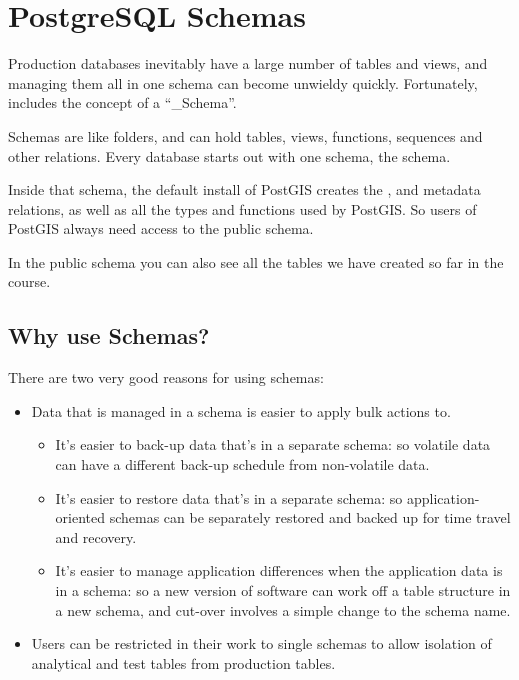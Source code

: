 \documentclass[a4paper,11pt,english]{sphinxmanual}
\begin{document}
\section{PostgreSQL Schemas}
\label{\detokenize{maintenance:postgresql-schemas}}\label{\detokenize{maintenance:schemas}}
Production databases inevitably have a large number of tables and views, and managing them all in one schema can become unwieldy quickly. Fortunately,  includes the concept of a “\_Schema”.

Schemas are like folders, and can hold tables, views, functions, sequences and other relations.  Every database starts out with one schema, the  schema.

\noindent{}

Inside that schema, the default install of PostGIS creates the ,  and  metadata relations, as well as all the types and functions used by PostGIS. So users of PostGIS always need access to the public schema.

In the public schema you can also see all the tables we have created so far in the course.


\subsection{Why use Schemas?}
\label{\detokenize{maintenance:why-use-schemas}}
There are two very good reasons for using schemas:
\begin{itemize}
\item {} 
Data that is managed in a schema is easier to apply bulk actions to.
\begin{itemize}
\item {} 
It’s easier to back-up data that’s in a separate schema: so volatile data can have a different back-up schedule from non-volatile data.

\item {} 
It’s easier to restore data that’s in a separate schema: so application-oriented schemas can be separately restored and backed up for time travel and recovery.

\item {} 
It’s easier to manage application differences when the application data is in a schema: so a new version of software can work off a table structure in a new schema, and cut-over involves a simple change to the schema name.

\end{itemize}

\item {} 
Users can be restricted in their work to single schemas to allow isolation of analytical and test tables from production tables.

\end{itemize}
\end{document}
